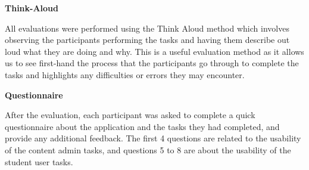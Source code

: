 \documentclass{l3proj}
\begin{document}
\textbf{Think-Aloud}

All evaluations were performed using the Think Aloud method which involves observing the participants performing the tasks and having them describe out loud what they are doing and why. This is a useful evaluation method as it allows us to see first-hand the process that the participants go through to complete the tasks and highlights any difficulties or errors they may encounter.

\textbf{Questionnaire}

After the evaluation, each participant was asked to complete a quick questionnaire about the application and the tasks they had completed, and provide any additional feedback. The first 4 questions are related to the usability of the content admin tasks, and questions 5 to 8 are about the usability of the student user tasks.
\end{document}
